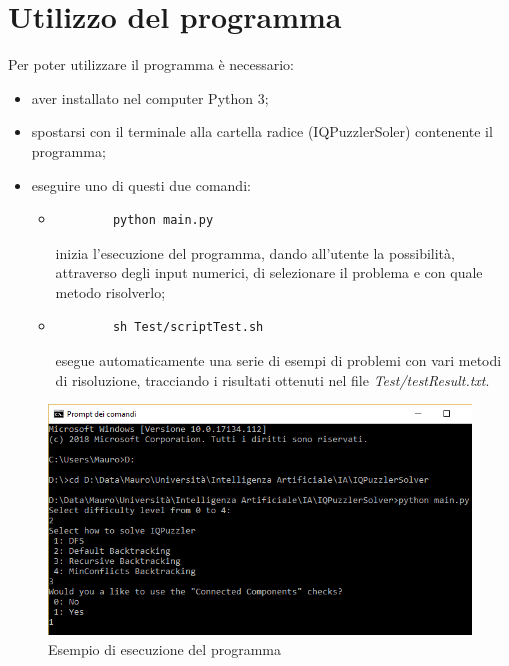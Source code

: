 \section{Utilizzo del programma}
Per poter utilizzare il programma è necessario:
\begin{itemize}
	\item aver installato nel computer Python 3;
	\item spostarsi con il terminale alla cartella radice (IQPuzzlerSoler) contenente il programma;
	\item eseguire uno di questi due comandi:
	\begin{itemize}
		\item \begin{verbatim}
		python main.py
		\end{verbatim}inizia l'esecuzione del programma, dando all'utente la possibilità, attraverso degli input numerici, di selezionare il problema e con quale metodo risolverlo;
		\item \begin{verbatim}
		sh Test/scriptTest.sh
		\end{verbatim}esegue automaticamente una serie di esempi di problemi con vari metodi di risoluzione, tracciando i risultati ottenuti nel file \textit{Test/testResult.txt}. 
	\end{itemize}
\end{itemize}
\begin{figure}[h]
	\centering
	\includegraphics[scale=0.65]{immagini/exe}
	\caption{Esempio di esecuzione del programma}
	\label{fig:exe}
\end{figure}


